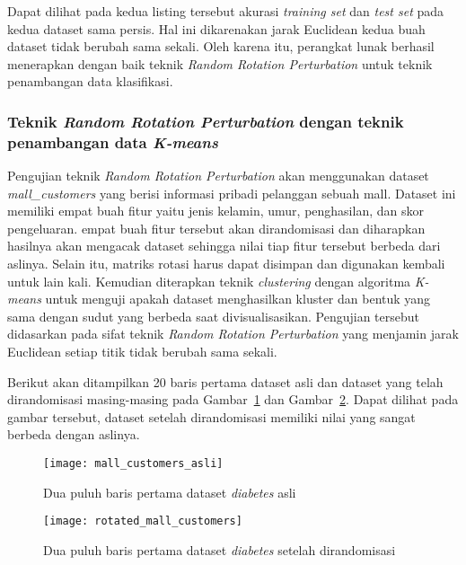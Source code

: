 Dapat dilihat pada kedua listing tersebut akurasi \textit{training set} dan \textit{test set} pada kedua dataset sama persis. Hal ini dikarenakan jarak Euclidean kedua buah dataset tidak berubah sama sekali. Oleh karena itu, perangkat lunak berhasil menerapkan dengan baik teknik \textit{Random Rotation Perturbation} untuk teknik penambangan data klasifikasi.

\subsubsection{Teknik \textit{Random Rotation Perturbation} dengan teknik penambangan data \textit{K-means}}
\label{sec:rrp-kmeans}

Pengujian teknik \textit{Random Rotation Perturbation} akan menggunakan dataset \textit{mall\_customers} yang berisi informasi pribadi pelanggan sebuah mall. Dataset ini memiliki empat buah fitur yaitu jenis kelamin, umur, penghasilan, dan skor pengeluaran. empat buah fitur tersebut akan dirandomisasi dan diharapkan hasilnya akan mengacak dataset sehingga nilai tiap fitur tersebut berbeda dari aslinya. Selain itu, matriks rotasi harus dapat disimpan dan digunakan kembali untuk lain kali. Kemudian diterapkan teknik \textit{clustering} dengan algoritma \textit{K-means} untuk menguji apakah dataset menghasilkan kluster dan bentuk yang sama dengan sudut yang berbeda saat divisualisasikan. Pengujian tersebut didasarkan pada sifat teknik \textit{Random Rotation Perturbation} yang menjamin jarak Euclidean setiap titik tidak berubah sama sekali.

Berikut akan ditampilkan 20 baris pertama dataset asli dan dataset yang telah dirandomisasi masing-masing pada Gambar~\ref{fig:mall_customers_asli} dan Gambar~\ref{fig:rotated_mall_customers}. Dapat dilihat pada gambar tersebut, dataset setelah dirandomisasi memiliki nilai yang sangat berbeda dengan aslinya.

\begin{figure}
	\centering
	\texttt{[image: mall\_customers\_asli]}
	\caption{Dua puluh baris pertama dataset \textit{diabetes} asli}
	\label{fig:mall_customers_asli}
\end{figure}

\begin{figure}
	\centering
	\texttt{[image: rotated\_mall\_customers]}
	\caption{Dua puluh baris pertama dataset \textit{diabetes} setelah dirandomisasi}
	\label{fig:rotated_mall_customers}
\end{figure}

